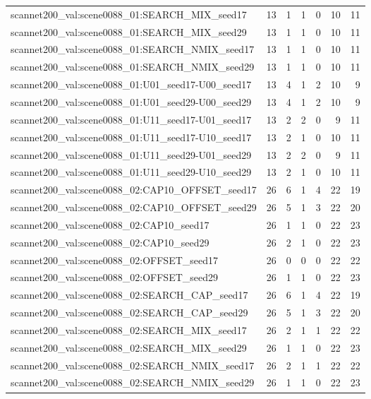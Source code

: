 \begin{table}[t]
\begin{tabular}{lrrrrrr}
scannet200\_val:scene0088\_01:SEARCH\_MIX\_seed17 & 13 & 1 & 1 & 0 & 10 & 11 \\
scannet200\_val:scene0088\_01:SEARCH\_MIX\_seed29 & 13 & 1 & 1 & 0 & 10 & 11 \\
scannet200\_val:scene0088\_01:SEARCH\_NMIX\_seed17 & 13 & 1 & 1 & 0 & 10 & 11 \\
scannet200\_val:scene0088\_01:SEARCH\_NMIX\_seed29 & 13 & 1 & 1 & 0 & 10 & 11 \\
scannet200\_val:scene0088\_01:U01\_seed17-U00\_seed17 & 13 & 4 & 1 & 2 & 10 & 9 \\
scannet200\_val:scene0088\_01:U01\_seed29-U00\_seed29 & 13 & 4 & 1 & 2 & 10 & 9 \\
scannet200\_val:scene0088\_01:U11\_seed17-U01\_seed17 & 13 & 2 & 2 & 0 & 9 & 11 \\
scannet200\_val:scene0088\_01:U11\_seed17-U10\_seed17 & 13 & 2 & 1 & 0 & 10 & 11 \\
scannet200\_val:scene0088\_01:U11\_seed29-U01\_seed29 & 13 & 2 & 2 & 0 & 9 & 11 \\
scannet200\_val:scene0088\_01:U11\_seed29-U10\_seed29 & 13 & 2 & 1 & 0 & 10 & 11 \\
scannet200\_val:scene0088\_02:CAP10\_OFFSET\_seed17 & 26 & 6 & 1 & 4 & 22 & 19 \\
scannet200\_val:scene0088\_02:CAP10\_OFFSET\_seed29 & 26 & 5 & 1 & 3 & 22 & 20 \\
scannet200\_val:scene0088\_02:CAP10\_seed17 & 26 & 1 & 1 & 0 & 22 & 23 \\
scannet200\_val:scene0088\_02:CAP10\_seed29 & 26 & 2 & 1 & 0 & 22 & 23 \\
scannet200\_val:scene0088\_02:OFFSET\_seed17 & 26 & 0 & 0 & 0 & 22 & 22 \\
scannet200\_val:scene0088\_02:OFFSET\_seed29 & 26 & 1 & 1 & 0 & 22 & 23 \\
scannet200\_val:scene0088\_02:SEARCH\_CAP\_seed17 & 26 & 6 & 1 & 4 & 22 & 19 \\
scannet200\_val:scene0088\_02:SEARCH\_CAP\_seed29 & 26 & 5 & 1 & 3 & 22 & 20 \\
scannet200\_val:scene0088\_02:SEARCH\_MIX\_seed17 & 26 & 2 & 1 & 1 & 22 & 22 \\
scannet200\_val:scene0088\_02:SEARCH\_MIX\_seed29 & 26 & 1 & 1 & 0 & 22 & 23 \\
scannet200\_val:scene0088\_02:SEARCH\_NMIX\_seed17 & 26 & 2 & 1 & 1 & 22 & 22 \\
scannet200\_val:scene0088\_02:SEARCH\_NMIX\_seed29 & 26 & 1 & 1 & 0 & 22 & 23 \\

\end{tabular}
\end{table}
